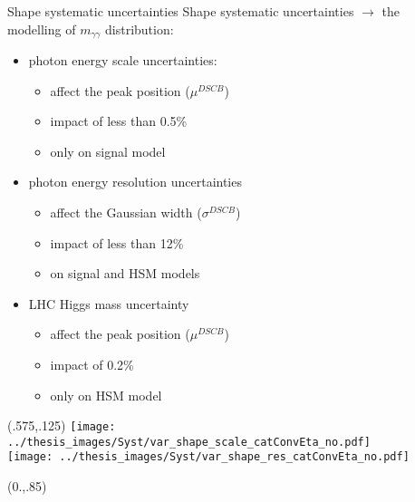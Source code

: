 \documentclass[10pt,UKenglish, leqno, xcolor = dvipsnames]{beamer}
\begin{document}
	\begin{frame}{Shape systematic uncertainties}
		\vfill
		Shape systematic uncertainties $\to$ the\\ modelling of $m_{\gamma\gamma}$ distribution:
		\begin{itemize}
			\item photon energy scale uncertainties:
			\begin{itemize}
				\item affect the peak position ($\mu^{DSCB}$)
				\item impact of less than 0.5\%
				\item only on signal model
			\end{itemize}
			\item photon energy resolution uncertainties
			\begin{itemize}
				\item affect the Gaussian width ($\sigma^{DSCB}$)
				\item impact of less than 12\%
				\item on signal and HSM models
			\end{itemize}
			\item LHC Higgs mass uncertainty
			\begin{itemize}
				\item affect the peak position ($\mu^{DSCB}$)
				\item impact of 0.2\%
				\item only on HSM model
			\end{itemize}
		\end{itemize}
		\vspace{.2cm}
		\vfill
		\begin{textblock}{1}(.575,.125)
			\texttt{[image: ../thesis\_images/Syst/var\_shape\_scale\_catConvEta\_no.pdf]}\\
			\texttt{[image: ../thesis\_images/Syst/var\_shape\_res\_catConvEta\_no.pdf]}\\	
		\end{textblock}	
		\begin{textblock}{1}(0.,.85)
			\begin{figure}
			\end{figure}
		\end{textblock}
	\end{frame}
\end{document}
